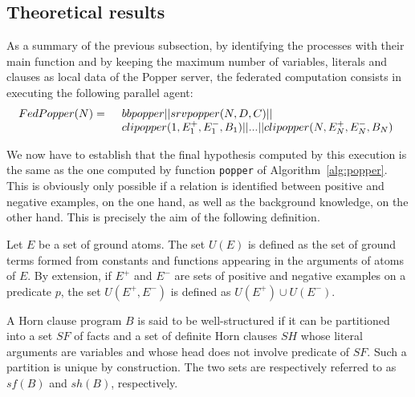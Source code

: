\subsection{Theoretical results}

As a summary of the previous subsection, by identifying the processes with their main function and by keeping the maximum number of variables, literals and clauses as local data of the Popper server, the federated computation consists in executing the following parallel agent:
%
\begin{eqnarray}
FedPopper(N) & = & \begin{array}[t]{l}
                     bbpopper || srvpopper(N, D, C) || \\
                     clipopper(1,E_1^+,E_1^-,B_1) || ... || 
                     clipopper(N,E_N^+,E_N^-,B_N)
                    \end{array}
\label{eqn-FedPopper}               
\end{eqnarray}

We now have to establish that the final hypothesis computed by this execution is the same as the one computed by function \texttt{popper} of Algorithm~\ref{alg:popper}. This is obviously only possible if a relation is identified between positive and negative examples, on the one hand, as well as the background knowledge, on the other hand. This is precisely the aim of the following definition.

\begin{definition}
Let $E$ be a set of ground atoms. The set $U(E)$ is defined as the set of ground terms formed from constants and functions appearing in the arguments of atoms of $E$. By extension, if $E^+$ and $E^-$ are sets of positive and negative examples on a predicate $p$, the set $U(E^+,E^-)$ is defined as $U(E^+) \cup U(E^-)$.
\end{definition}

\begin{definition}
 A Horn clause program $B$ is said to be well-structured if it can be partitioned into a set $SF$ of facts and a set of definite Horn clauses $SH$ whose literal arguments are variables and whose head does not involve predicate of $SF$. Such a partition is unique by construction. The two sets are respectively referred to as
 $sf(B)$ and $sh(B)$, respectively.
\end{definition}

